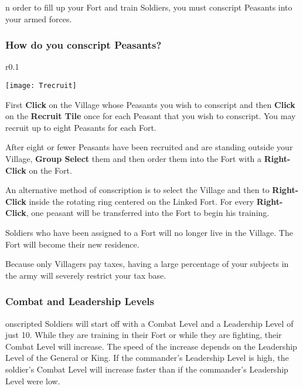 
n order to fill up your Fort and train Soldiers, you must conscript Peasants into your armed forces.

\subsubsection{How do you conscript Peasants?}

\begin{wrapfigure}{r}{0.1\textwidth}
    \vspace{-20pt}
    \begin{center}
        \texttt{[image: Trecruit]}
    \end{center}
    \vspace{-20pt}
\end{wrapfigure}

First \textbf{Click} on the Village whose Peasants you wish to conscript and then \textbf{Click} on the \textbf{Recruit Tile} once for each Peasant that you wish to conscript. You may recruit up to eight Peasants for each Fort.

After eight or fewer Peasants have been recruited and are standing outside your Village, \textbf{Group Select} them and then order them into the Fort with a \textbf{Right-Click} on the Fort.

An alternative method of conscription is to select the Village and then to \textbf{Right-Click} inside the rotating ring centered on the Linked Fort. For every \textbf{Right-Click}, one peasant will be transferred into the Fort to begin his training.

Soldiers who have been assigned to a Fort will no longer live in the Village. The Fort will become their new residence.

Because only Villagers pay taxes, having a large percentage of your subjects in the army will severely restrict your tax base.

\subsubsection{Combat and Leadership Levels}


onscripted Soldiers will start off with a Combat Level and a Leadership Level of just 10. While they are training in their Fort or while they are fighting, their Combat Level will increase. The speed of the increase depends on the Leadership Level of the General or King. If the commander’s Leadership Level is high, the soldier’s Combat Level will increase faster than if the commander’s Leadership Level were low.


